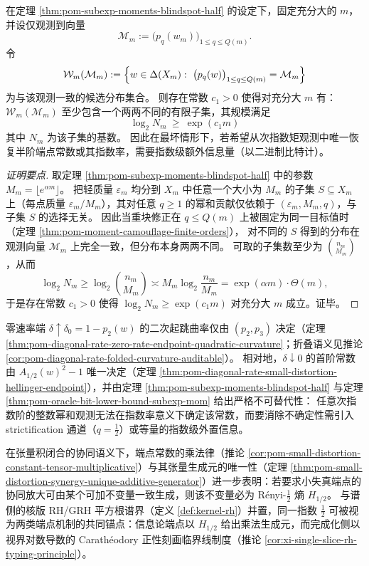 \begin{theorem}\label{thm:pom-oracle-bit-lower-bound-subexp-mom}
在定理 \ref{thm:pom-subexp-moments-blindspot-half} 的设定下，固定充分大的 \(m\)，并设仅观测到向量
\[
\mathcal{M}_m:=\bigl(p_q(w_m)\bigr)_{1\le q\le Q(m)}.
\]
令
\[
\mathcal{W}_m(\mathcal{M}_m):=\Bigl\{w\in\Delta(X_m):\ \bigl(p_q(w)\bigr)_{1\le q\le Q(m)}=\mathcal{M}_m\Bigr\}
\]
为与该观测一致的候选分布集合。
则存在常数 \(c_1>0\) 使得对充分大 \(m\) 有：\(\mathcal{W}_m(\mathcal{M}_m)\) 至少包含一个两两不同的有限子集，其规模满足
\[
\boxed{\;
\log_2 N_m\ \ge\ \exp(c_1 m)\;}
\]
其中 \(N_m\) 为该子集的基数。
因此在最坏情形下，若希望从次指数矩观测中唯一恢复半阶端点常数或其指数率，需要指数级额外信息量（以二进制比特计）。
\end{theorem}
\begin{proof}[证明要点]
取定理 \ref{thm:pom-subexp-moments-blindspot-half} 中的参数 \(M_m=\lfloor e^{\alpha m}\rfloor\)。
把轻质量 \(\varepsilon_m\) 均分到 \(X_m\) 中任意一个大小为 \(M_m\) 的子集 \(S\subseteq X_m\) 上（每点质量 \(\varepsilon_m/M_m\)），其对任意 \(q\ge 1\) 的幂和贡献仅依赖于 \((\varepsilon_m,M_m,q)\)，与子集 \(S\) 的选择无关。
因此当重块修正在 \(q\le Q(m)\) 上被固定为同一目标值时（定理 \ref{thm:pom-moment-camouflage-finite-orders}），
对不同的 \(S\) 得到的分布在观测向量 \(\mathcal{M}_m\) 上完全一致，但分布本身两两不同。
可取的子集数至少为 \(\binom{n_m}{M_m}\)，从而
\[
\log_2 N_m\ge \log_2\binom{n_m}{M_m}
\asymp M_m\log_2\frac{n_m}{M_m}
=\exp(\alpha m)\cdot \Theta(m),
\]
于是存在常数 \(c_1>0\) 使得 \(\log_2 N_m\ge \exp(c_1 m)\) 对充分大 \(m\) 成立。证毕。
\end{proof}

\begin{remark}\label{rem:pom-endpoint-biphase-moment-vs-half}
零速率端 \(\delta\uparrow\delta_0=1-p_2(w)\) 的二次起跳曲率仅由 \((p_2,p_3)\) 决定（定理 \ref{thm:pom-diagonal-rate-zero-rate-endpoint-quadratic-curvature}；折叠语义见推论 \ref{cor:pom-diagonal-rate-folded-curvature-auditable}）。
相对地，\(\delta\downarrow 0\) 的首阶常数由 \(A_{1/2}(w)^2-1\) 唯一决定（定理 \ref{thm:pom-diagonal-rate-small-distortion-hellinger-endpoint}），并由定理 \ref{thm:pom-subexp-moments-blindspot-half} 与定理 \ref{thm:pom-oracle-bit-lower-bound-subexp-mom} 给出严格不可替代性：
任意次指数阶的整数幂和观测无法在指数率意义下确定该常数，而要消除不确定性需引入 strictification 通道（\(q=\tfrac12\)）或等量的指数级外置信息。
\par
在张量积闭合的协同语义下，端点常数的乘法律（推论 \ref{cor:pom-small-distortion-constant-tensor-multiplicative}）与其张量生成元的唯一性（定理 \ref{thm:pom-small-distortion-synergy-unique-additive-generator}）进一步表明：若要求小失真端点的协同放大可由某个可加不变量一致生成，则该不变量必为 Rényi-\(\tfrac12\) 熵 \(H_{1/2}\)。
与谱侧的核版 RH/GRH 平方根谱界（定义 \ref{def:kernel-rh}）并置，同一指数 \(\tfrac12\) 可被视为两类端点机制的共同锚点：信息论端点以 \(H_{1/2}\) 给出乘法生成元，而完成化侧以视界对数导数的 Carath\'eodory 正性刻画临界线制度（推论 \ref{cor:xi-single-slice-rh-typing-principle}）。
\end{remark}

